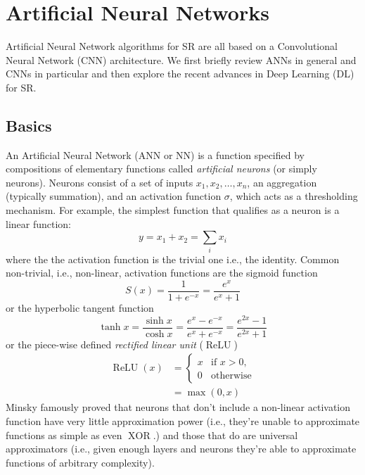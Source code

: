 %
\section{Artificial Neural Networks}\label{sec:neural-networks}
\localtableofcontents
Artificial Neural Network algorithms for SR are all based on a Convolutional Neural Network (CNN) architecture. 
%
We first briefly review ANNs in general and CNNs in particular and then explore the recent advances in Deep Learning (DL) for SR.
%
\subsection{Basics}

An Artificial Neural Network (ANN or NN) is a function specified by compositions of elementary functions called \textit{artificial neurons} (or simply neurons).
%
Neurons consist of a set of inputs \(x_1, x_2, \dots, x_n\), an aggregation (typically summation), and an activation function \(\sigma\), which acts as a thresholding mechanism. 
%
For example, the simplest function that qualifies as a neuron is a linear function:
\begin{equation}
    y = x_1 + x_2 = \sum_i x_i
\end{equation}
where the the activation function is the trivial one i.e., the identity.
%
Common non-trivial, i.e., non-linear, activation functions are the sigmoid function
\begin{equation}
    S(x)={\frac {1}{1+e^{-x}}}={\frac {e^{x}}{e^{x}+1}}
\end{equation}
or the hyperbolic tangent function 
\begin{equation}
    \tanh x={\frac {\sinh x}{\cosh x}}={\frac {e^{x}-e^{-x}}{e^{x}+e^{-x}}}={\frac {e^{2x}-1}{e^{2x}+1}}
\end{equation}
or the piece-wise defined \textit{rectified linear unit} (\(\operatorname{ReLU}\))
\begin{align}
\operatorname{ReLU}(x) &=\begin{cases}x&{\text{if }}x>0,\\0&{\text{otherwise}}\end{cases} \\ 
    &= \max(0, x)
\end{align}
%
Minsky \etal\cite{minsky2017perceptrons} famously proved that neurons that don't include a non-linear activation function have very little approximation power (i.e., they're unable to approximate functions as simple as even \(\operatorname{XOR}\).) and those that do are universal approximators (i.e., given enough layers and neurons they're able to approximate functions of arbitrary complexity).
